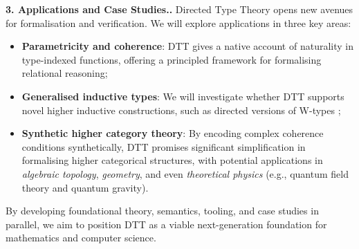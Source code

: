 \documentclass[a4paper,11pt]{article}
\let\oldcite\cite
\renewcommand*\cite[1]{{\protect\NoHyper\oldcite{#1}\protect\endNoHyper}}
\renewcommand{\paragraph}[1]{\textbf{#1.}}
\begin{document}
\paragraph{3. Applications and Case Studies.}
Directed Type Theory opens new avenues for formalisation and verification. We will explore applications in three key areas:
\begin{itemize}
  \item \textbf{Parametricity and coherence}: DTT gives a native account of naturality in type-indexed functions, offering a principled framework for formalising relational reasoning;
  \item \textbf{Generalised inductive types}: We will investigate whether DTT supports novel higher inductive constructions, such as directed versions of W-types \cite{txa-hottuf24};
  \item \textbf{Synthetic higher category theory}: By encoding complex coherence conditions synthetically, DTT promises significant simplification in formalising higher categorical structures, with potential applications in \emph{algebraic topology}, \emph{geometry}, and even \emph{theoretical physics} (e.g., quantum field theory and quantum gravity).
\end{itemize}

By developing foundational theory, semantics, tooling, and case studies in parallel, we aim to position DTT as a viable next-generation foundation for mathematics and computer science.



\end{document}
